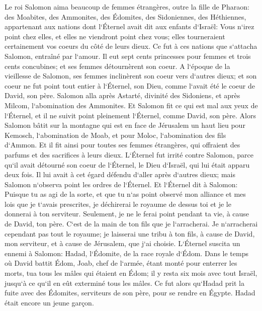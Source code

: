 \verse Le roi Salomon aima beaucoup de femmes étrangères, outre la fille de Pharaon: des Moabites, des Ammonites, des Édomites, des Sidoniennes, des Héthiennes, 
\verse appartenant aux nations dont l`Éternel avait dit aux enfants d`Israël: Vous n`irez point chez elles, et elles ne viendront point chez vous; elles tourneraient certainement vos coeurs du côté de leurs dieux. Ce fut à ces nations que s`attacha Salomon, entraîné par l`amour. 
\verse Il eut sept cents princesses pour femmes et trois cents concubines; et ses femmes détournèrent son coeur. 
\verse A l`époque de la vieillesse de Salomon, ses femmes inclinèrent son coeur vers d`autres dieux; et son coeur ne fut point tout entier à l`Éternel, son Dieu, comme l`avait été le coeur de David, son père. 
\verse Salomon alla après Astarté, divinité des Sidoniens, et après Milcom, l`abomination des Ammonites. 
\verse Et Salomon fit ce qui est mal aux yeux de l`Éternel, et il ne suivit point pleinement l`Éternel, comme David, son père. 
\verse Alors Salomon bâtit sur la montagne qui est en face de Jérusalem un haut lieu pour Kemosch, l`abomination de Moab, et pour Moloc, l`abomination des fils d`Ammon. 
\verse Et il fit ainsi pour toutes ses femmes étrangères, qui offraient des parfums et des sacrifices à leurs dieux. 
\verse L`Éternel fut irrité contre Salomon, parce qu`il avait détourné son coeur de l`Éternel, le Dieu d`Israël, qui lui était apparu deux fois. 
\verse Il lui avait à cet égard défendu d`aller après d`autres dieux; mais Salomon n`observa point les ordres de l`Éternel. 
\verse Et l`Éternel dit à Salomon: Puisque tu as agi de la sorte, et que tu n`as point observé mon alliance et mes lois que je t`avais prescrites, je déchirerai le royaume de dessus toi et je le donnerai à ton serviteur. 
\verse Seulement, je ne le ferai point pendant ta vie, à cause de David, ton père. C`est de la main de ton fils que je l`arracherai. 
\verse Je n`arracherai cependant pas tout le royaume; je laisserai une tribu à ton fils, à cause de David, mon serviteur, et à cause de Jérusalem, que j`ai choisie. 
\verse L`Éternel suscita un ennemi à Salomon: Hadad, l`Édomite, de la race royale d`Édom. 
\verse Dans le temps où David battit Édom, Joab, chef de l`armée, étant monté pour enterrer les morts, tua tous les mâles qui étaient en Édom; 
\verse il y resta six mois avec tout Israël, jusqu`à ce qu`il en eût exterminé tous les mâles. 
\verse Ce fut alors qu`Hadad prit la fuite avec des Édomites, serviteurs de son père, pour se rendre en Égypte. Hadad était encore un jeune garçon. 
